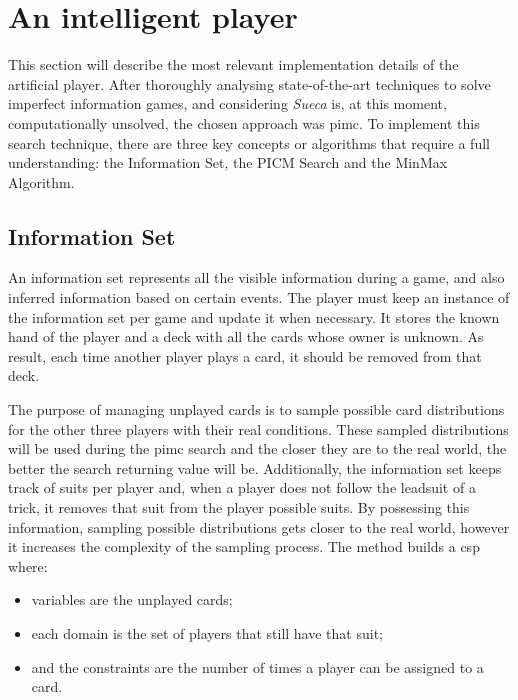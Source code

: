 \section{An intelligent player}%
\label{sec:artificial_player}

This section will describe the most relevant implementation details of the artificial player.
After thoroughly analysing state-of-the-art techniques to solve imperfect information games, and considering \emph{Sueca} is, at this moment, computationally unsolved, the chosen approach was \ac{pimc}.
To implement this search technique, there are three key concepts or algorithms that require a full understanding: the Information Set, the PICM Search and the MinMax Algorithm.

\subsection*{Information Set}

An information set represents all the visible information during a game, and also inferred information based on certain events.
The player must keep an instance of the information set per game and update it when necessary.
It stores the known hand of the player and a deck with all the cards whose owner is unknown.
As result, each time another player plays a card, it should be removed from that deck.

The purpose of managing unplayed cards is to sample possible card distributions for the other three players with their real conditions.
These sampled distributions will be used during the \ac{pimc} search and the closer they are to the real world, the better the search returning value will be.
Additionally, the information set keeps track of suits per player and, when a player does not follow the leadsuit of a trick, it removes that suit from the player possible suits.
By possessing this information, sampling possible distributions gets closer to the real world, however it increases the complexity of the sampling process.
The method builds a \ac{csp} where:
\begin{itemize}
\item variables are the unplayed cards;
\item each domain is the set of players that still have that suit;
\item and the constraints are the number of times a player can be assigned to a card.
\end{itemize}



